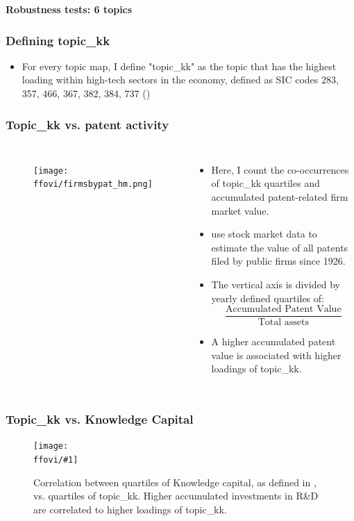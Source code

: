 \documentclass{beamer}
\newcommand{\ffovi}{dicfullmc10thr10defnob5noa0_8_6t}
\newcommand{\insertfigurevi}[2]{
\begin{figure}[h!]
  \centering
  \texttt{[image: \\ffovi/\#1]}
  \centering
  \captionsetup{font=scriptsize}
  \caption{#2}
  \label{fig:#1}
\end{figure}
}
\begin{document}
\begin{frame}
\label{robsix}
\centering
\huge\bfseries Robustness tests: 6 topics
\hyperlink{results}{}
\end{frame}

\begin{frame}
  \frametitle{Defining topic\_kk}
  \begin{itemize}

  \item For every topic map, I define "topic\_kk" as the topic that has the highest loading within high-tech sectors in the economy, defined as SIC codes 283, 357, 466, 367, 382, 384, 737 (\cite{Brown2009-zp}) 
  \tiny
  
\end{itemize}

\end{frame}


\begin{frame}
\frametitle{Topic\_kk vs. patent activity}
       \begin{columns}
             \begin{figure}[h!]
		  \centering
		  \texttt{[image: \\ffovi/firmsbypat\_hm.png]}
		  \captionsetup{font=scriptsize}
		  \label{fig:firmsbypathm}
			\end{figure}
          \scriptsize
              \begin{itemize}
              \item Here, I count the co-occurrences of topic\_kk quartiles and accumulated patent-related firm market value.
              \item \cite{Kogan2017-fx} use stock market data to estimate the value of all patents filed by public firms since 1926.
			  \item The vertical axis is divided by yearly defined quartiles of:
			  \begin{equation}
  				\frac{\text{Accumulated Patent Value}}{\text{Total assets}}
				\end{equation}
			  \item A higher accumulated patent value is associated with higher loadings of topic\_kk.
			\end{itemize}
	  \end{columns} 
\end{frame}

\begin{frame}
\frametitle{Topic\_kk vs. Knowledge Capital}
\scriptsize
\insertfigurevi{topicvskkpt_hm}{Correlation between quartiles of Knowledge capital,  as defined in \cite{Peters2017-fl}, vs. quartiles of topic\_kk. Higher accumulated investments in R\&D are correlated to higher loadings of topic\_kk.}
\end{frame}
\end{document}
